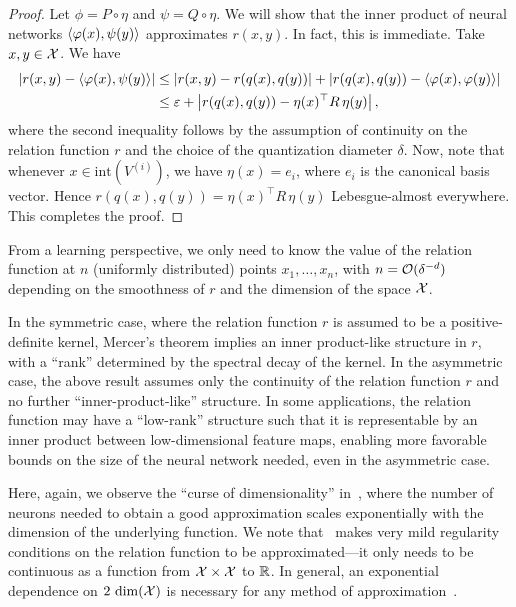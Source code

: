 \begin{proof}
    Let $\phi = P \circ \eta$ and $\psi = Q \circ \eta$. We will show that the inner product of neural networks $\left \langle \varphi(x), \psi(y) \right\rangle$ approximates $r(x, y)$. In fact, this is immediate. Take $x, y \in {\mathcal{X}}$. We have
    \begin{align*}
        \abs{r(x, y) - \iprod{\phi(x)}{\psi(y)}} &\leq \abs{r(x, y) - r(q(x), q(y))} + \abs{r(q(x), q(y)) - \iprod{\phi(x)}{\phi(y)}}\\
        &\leq \epsilon + \abs{r(q(x), q(y)) - \eta(x)^\top R\, \eta(y)},
    \end{align*}
    where the second inequality follows by the assumption of continuity on the relation function $r$ and the choice of the quantization diameter $\delta$. Now, note that whenever $x \in \mathrm{int}(V^{(i)})$, we have $\eta(x) = e_i$, where $e_i$ is the canonical basis vector. Hence $r(q(x), q(y)) = \eta(x)^\top R\, \eta(y)$ Lebesgue-almost everywhere. This completes the proof.
\end{proof}

\begin{remark}
    From a learning perspective, we only need to know the value of the relation function at $n$ (uniformly distributed) points $x_1, \ldots, x_n$, with $n = {\mathcal{O}}(\delta^{-d})$ depending on the smoothness of $r$ and the dimension of the space ${\mathcal{X}}$.
\end{remark}

\begin{remark}
    In the symmetric case, where the relation function $r$ is assumed to be a positive-definite kernel, Mercer's theorem implies an inner product-like structure in $r$, with a ``rank'' determined by the spectral decay of the kernel. In the asymmetric case, the above result assumes only the continuity of the relation function $r$ and no further ``inner-product-like'' structure. In some applications, the relation function may have a ``low-rank'' structure such that it is representable by an inner product between low-dimensional feature maps, enabling more favorable bounds on the size of the neural network needed, even in the asymmetric case.
\end{remark}

Here, again, we observe the ``curse of dimensionality'' in~, where the number of neurons needed to obtain a good approximation scales exponentially with the dimension of the underlying function. We note that~ makes very mild regularity conditions on the relation function to be approximated---it only needs to be continuous as a function from ${\mathcal{X}} \times {\mathcal{X}}$ to $\mathbb{R}$. In general, an exponential dependence on $2\, \dim({\mathcal{X}})$ is necessary for any method of approximation~\citep{pinkus1999approximation,devore1998nonlinear,maiorov1999lower,maiorov2000near,poggioWhyWhenCan2017}.

